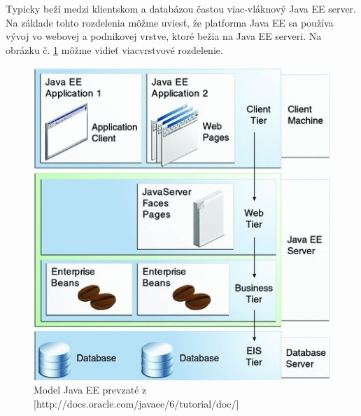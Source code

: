 Typicky beží medzi klientskom a databázou častou viac-vláknový Java EE server. Na základe tohto rozdelenia môžme uviesť, že platforma Java EE sa používa vývoj vo webovej a podnikovej vrstve, ktoré bežia na Java EE serveri.  Na obrázku č. \ref{model} môžme vidieť viacvrstvové rozdelenie.
\begin{figure}[htb]

\begin{center}

\includegraphics[scale=0.5]{model.jpg} 
\caption{Model Java EE prevzaté z [http://docs.oracle.com/javaee/6/tutorial/doc/]}
\label{model}

\end{center}

\end{figure}
